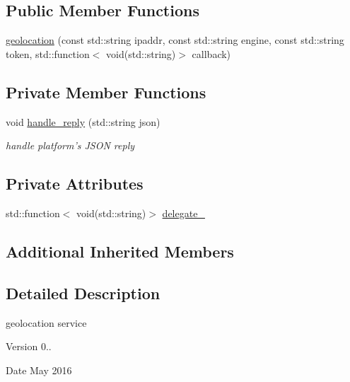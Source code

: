 \subsection*{Public Member Functions}
\begin{DoxyCompactItemize}
\item 
\hyperlink{classrapp_1_1cloud_1_1geolocation_a173516c0ebeadcc048bf852f3e200fbe}{geolocation} (const std\-::string ipaddr, const std\-::string engine, const std\-::string token, std\-::function$<$ void(std\-::string)$>$ callback)
\end{DoxyCompactItemize}
\subsection*{Private Member Functions}
\begin{DoxyCompactItemize}
\item 
void \hyperlink{classrapp_1_1cloud_1_1geolocation_a738396e3461b61e05ec576cc29743e43}{handle\-\_\-reply} (std\-::string json)
\begin{DoxyCompactList}\small\item\em handle platform's J\-S\-O\-N reply \end{DoxyCompactList}\end{DoxyCompactItemize}
\subsection*{Private Attributes}
\begin{DoxyCompactItemize}
\item 
std\-::function$<$ void(std\-::string)$>$ \hyperlink{classrapp_1_1cloud_1_1geolocation_a7404b97bd414a0a112fde589db81f36a}{delegate\-\_\-}
\end{DoxyCompactItemize}
\subsection*{Additional Inherited Members}


\subsection{Detailed Description}
geolocation service 

\begin{DoxyVersion}{Version}
0.. 
\end{DoxyVersion}
\begin{DoxyDate}{Date}
May 2016 
\end{DoxyDate}



